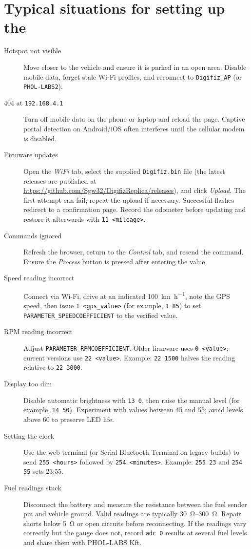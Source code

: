 \chapter{Typical situations for setting up the \ReplicaNextLong{}}\label{ch:replica-next-scenarios}

\begin{description}
    \item[Hotspot not visible] Move closer to the vehicle and ensure it is parked in an open area. Disable mobile data, forget stale Wi-Fi profiles, and reconnect to \texttt{Digifiz\_AP} (or \texttt{PHOL-LABS2}).
    \item[404 at \texttt{192.168.4.1}] Turn off mobile data on the phone or laptop and reload the page. Captive portal detection on Android/iOS often interferes until the cellular modem is disabled.
    \item[Firmware updates] Open the \emph{WiFi} tab, select the supplied \texttt{Digifiz.bin} file (the latest releases are published at \url{https://github.com/Sgw32/DigifizReplica/releases}), and click \emph{Upload}. The first attempt can fail; repeat the upload if necessary. Successful flashes redirect to a confirmation page. Record the odometer before updating and restore it afterwards with \verb|11 <mileage>|.
    \item[Commands ignored] Refresh the browser, return to the \emph{Control} tab, and resend the command. Ensure the \emph{Process} button is pressed after entering the value.
    \item[Speed reading incorrect] Connect via Wi-Fi, drive at an indicated \SI{100}{\kilo\metre\per\hour}, note the GPS speed, then issue \verb|1 <gps_value>| (for example, \verb|1 85|) to set \texttt{PARAMETER\_SPEEDCOEFFICIENT} to the verified value.
    \item[RPM reading incorrect] Adjust \texttt{PARAMETER\_RPMCOEFFICIENT}. Older firmware uses \verb|0 <value>|; current versions use \verb|22 <value>|. Example: \verb|22 1500| halves the reading relative to \verb|22 3000|.
    \item[Display too dim] Disable automatic brightness with \verb|13 0|, then raise the manual level (for example, \verb|14 50|). Experiment with values between 45 and 55; avoid levels above 60 to preserve LED life.
    \item[Setting the clock] Use the web terminal (or Serial Bluetooth Terminal on legacy builds) to send \verb|255 <hours>| followed by \verb|254 <minutes>|. Example: \verb|255 23| and \verb|254 55| sets 23:55.
    \item[Fuel readings stuck] Disconnect the battery and measure the resistance between the fuel sender pin and vehicle ground. Valid readings are typically \SIrange{30}{300}{\ohm}. Repair shorts below \SI{5}{\ohm} or open circuits before reconnecting. If the readings vary correctly but the gauge does not, record \verb|adc 0| results at several fuel levels and share them with PHOL-LABS Kft.

\end{description}
